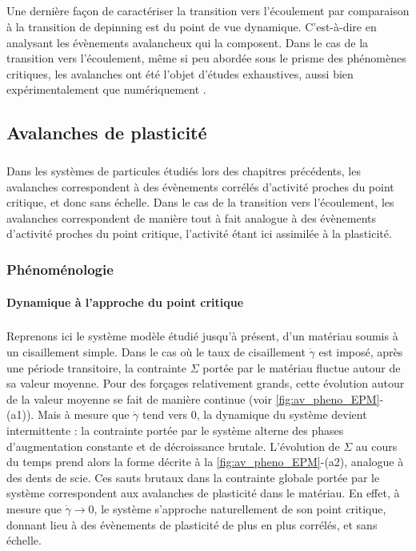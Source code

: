 \subparagraph{}Une dernière façon de caractériser la transition vers l'écoulement par comparaison à la transition de depinning est du point de vue dynamique. C'est-à-dire en analysant les évènements avalancheux qui la composent. Dans le cas de la transition vers l'écoulement, même si peu abordée sous le prisme des phénomènes critiques, les avalanches ont été l'objet d'études exhaustives, aussi bien expérimentalement que numériquement \cite{sun_plasticity_2010, lauridsen_shear-induced_2002, salerno_effect_2013, oyama_unified_2021, talamali_avalanches_2011, liu_driving_2016}.

\subsection{Avalanches de plasticité}

\subparagraph{}Dans les systèmes de particules étudiés lors des chapitres précédents, les avalanches correspondent à des évènements corrélés d'activité proches du point critique, et donc sans échelle. Dans le cas de la transition vers l'écoulement, les avalanches correspondent de manière tout à fait analogue à des évènements d'activité proches du point critique, l'activité étant ici assimilée à la plasticité.

\subsubsection{Phénoménologie}

\paragraph{Dynamique à l'approche du point critique}

\subparagraph{}Reprenons ici le système modèle étudié jusqu'à présent, d'un matériau soumis à un cisaillement simple. Dans le cas où le taux de cisaillement $\dot{\gamma}$ est imposé, après une période transitoire, la contrainte $\Sigma$ portée par le matériau fluctue autour de sa valeur moyenne. Pour des forçages relativement grands, cette évolution autour de la valeur moyenne se fait de manière continue (voir \autoref{fig:av_pheno_EPM}-(a1)). Mais à mesure que $\dot{\gamma}$ tend vers 0, la dynamique du système devient intermittente \cite{nicolas_deformation_2018} : la contrainte portée par le système alterne des phases d'augmentation constante et de décroissance brutale. L'évolution de $\Sigma$ au cours du temps prend alors la forme décrite à la \autoref{fig:av_pheno_EPM}-(a2), analogue à des dents de scie. Ces sauts brutaux dans la contrainte globale portée par le système correspondent aux avalanches de plasticité dans le matériau. En effet, à mesure que $\dot{\gamma}\rightarrow 0$, le système s'approche naturellement de son point critique, donnant lieu à des évènements de plasticité de plus en plus corrélés, et sans échelle.

